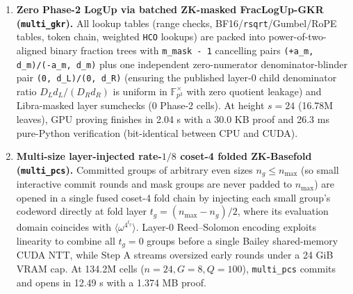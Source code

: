 \documentclass[10pt]{article}
\begin{document}
\begin{enumerate}
\item{} \textbf{Zero Phase-2 LogUp via batched ZK-masked FracLogUp-GKR (\texttt{multi\_\allowbreak{}gkr}).} All lookup tables (range checks, BF16/\texttt{rsqrt}/Gumbel/RoPE tables, token chain, weighted \texttt{HCO} lookups) are packed into power-of-two-aligned binary fraction trees with \texttt{m\_\allowbreak{}mask - 1} cancelling pairs \texttt{(+a\_\allowbreak{}m, d\_\allowbreak{}m)/(-a\_\allowbreak{}m, d\_\allowbreak{}m)} plus one independent zero-numerator denominator-blinder pair \texttt{(0, d\_\allowbreak{}L)/(0, d\_\allowbreak{}R)} (ensuring the published layer-0 child denominator ratio $D_L d_L / (D_R d_R)$ is uniform in $\mathbb F_{p^3}^\times$ with zero quotient leakage) and Libra-masked layer sumchecks (0 Phase-2 cells). At height $s = 24$ (16.78M leaves), GPU proving finishes in 2.04 s with a 30.0 KB proof and 26.3 ms pure-Python verification (bit-identical between CPU and CUDA).
\item{} \textbf{Multi-size layer-injected rate-$1/8$ coset-4 folded ZK-Basefold (\texttt{multi\_\allowbreak{}pcs}).} Committed groups of arbitrary even sizes $n_g \le n_{\max}$ (so small interactive commit rounds and mask groups are never padded to $n_{\max}$) are opened in a single fused coset-4 fold chain by injecting each small group's codeword directly at fold layer $t_g = (n_{\max} - n_g)/2$, where its evaluation domain coincides with $\langle\omega^{4^{t_g}}\rangle$. Layer-0 Reed--Solomon encoding exploits linearity to combine all $t_g = 0$ groups before a single Bailey shared-memory CUDA NTT, while Step A streams oversized early rounds under a 24 GiB VRAM cap. At 134.2M cells ($n=24, G=8, Q=100$), \texttt{multi\_\allowbreak{}pcs} commits and opens in 12.49 s with a 1.374 MB proof.

\end{enumerate}
\end{document}
